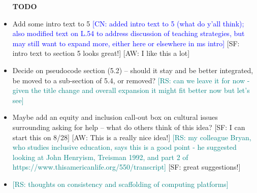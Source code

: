 \newcommand{\aw}[1]{{\textcolor{armygreen}{[AW: #1]}}} %
\newcommand{\sarah}[1]{{\textcolor{amethyst}{[SF: #1]}}} %
\newcommand{\rs}[1]{{\textcolor{teal}{[RS: #1]}}} %
\newcommand{\jo}[1]{{\textcolor{pauburn}{[JO: #1]}}} %
\newcommand{\cn}[1]{{\textcolor{blue}{[CN: #1]}}} %

\begin{itemize}
\item [\textbf{TODO}]
    \item Add some intro text to 5 \cn{added intro text to 5 (what do y'all think); also modified text on L.54 to address discussion of teaching strategies, but may still want to expand more, either here or elsewhere in ms intro} \sarah{intro text to section 5 looks great!} \aw{I like this a lot}
    \item Decide on pseudocode section (5.2) -- should it stay and be better integrated, be moved to a sub-section of 5.4, or removed? \rs{can we leave it for now - given the title change and overall expansion it might fit better now but let's see}
    \item Maybe add an equity and inclusion call-out box on cultural issues surrounding asking for help -- what do others think of this idea? \sarah{I can start this on 8/28} \aw{This is a really nice idea!} \rs{my colleague Bryan, who studies inclusive education, says this is a good point - he suggested looking at John Henryism, Treisman 1992, and part 2 of https://www.thisamericanlife.org/550/transcript} \sarah{great suggestions!}
    \item \rs{thoughts on consistency and scaffolding of computing platforms}

\end{itemize}
